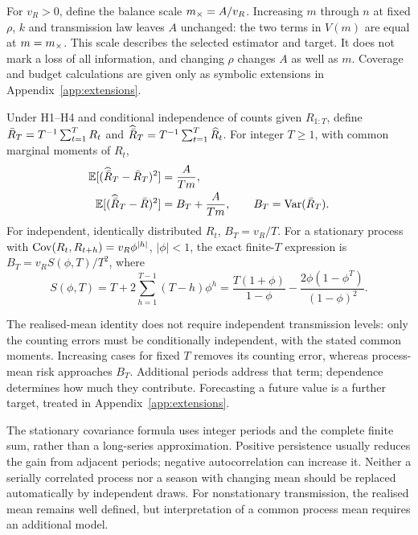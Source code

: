 For $v_R>0$, define the balance scale $m_{\times}=A/v_R$. Increasing $m$ through $n$ at fixed $\rho$, $k$ and transmission law leaves $A$ unchanged: the two terms in $V(m)$ are equal at $m=m_{\times}$. This scale describes the selected estimator and target. It does not mark a loss of all information, and changing $\rho$ changes $A$ as well as $m$. Coverage and budget calculations are given only as symbolic extensions in Appendix~\ref{app:extensions}.

\begin{corollary}
\label{cor:targets}
Under H1--H4 and conditional independence of counts given $R_{1:T}$, define $\bar R_T=T^{-1}\sum_{t=1}^T R_t$ and $\widehat{\bar R}_T=T^{-1}\sum_{t=1}^T\widehat R_t$. For integer $T\ge1$, with common marginal moments of $R_t$,
\begin{equation}
\begin{aligned}
  \mathbb{E}[(\widehat{\bar R}_T-\bar R_T)^2]&=\frac{A}{Tm},\\
  \mathbb{E}[(\widehat{\bar R}_T-\bar R)^2]&=B_T+\frac{A}{Tm},
  \qquad B_T=\mathrm{Var}(\bar R_T).
\end{aligned}
  \label{eq:target-means}
\end{equation}
For independent, identically distributed $R_t$, $B_T=v_R/T$. For a stationary process with $\mathrm{Cov}(R_t,R_{t+h})=v_R\phi^{|h|}$, $|\phi|<1$, the exact finite-$T$ expression is $B_T=v_RS(\phi,T)/T^2$, where
\begin{equation}
  S(\phi,T)=T+2\sum_{h=1}^{T-1}(T-h)\phi^h
  =\frac{T(1+\phi)}{1-\phi}-\frac{2\phi(1-\phi^T)}{(1-\phi)^2}.
  \label{eq:ar-sum}
\end{equation}
\end{corollary}

The realised-mean identity does not require independent transmission levels: only the counting errors must be conditionally independent, with the stated common moments. Increasing cases for fixed $T$ removes its counting error, whereas process-mean risk approaches $B_T$. Additional periods address that term; dependence determines how much they contribute. Forecasting a future value is a further target, treated in Appendix~\ref{app:extensions}.

The stationary covariance formula uses integer periods and the complete finite sum, rather than a long-series approximation. Positive persistence usually reduces the gain from adjacent periods; negative autocorrelation can increase it. Neither a serially correlated process nor a season with changing mean should be replaced automatically by independent draws. For nonstationary transmission, the realised mean remains well defined, but interpretation of a common process mean requires an additional model.

